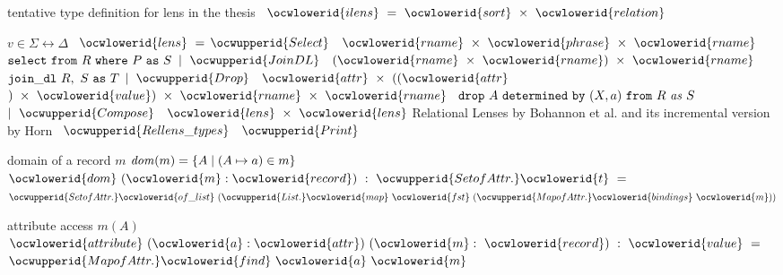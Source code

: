 \documentclass[12pt]{article}
\begin{document}
\ocwendcode{}\ocwindent{0.00em}
tentative type definition for lens in the thesis 
\ocweol
\label{rellens_types.ml:5410}%
\medskip
\ocwbegincode{}\ocwindent{0.00em}
~$\ocwlowerid{ilens}~=~\ocwlowerid{sort}~\times{}~\ocwlowerid{relation}$\medskip

\ocwendcode{}\ocwindent{0.00em}
$v \in \Sigma \leftrightarrow \Delta$ 
\ocweol
\label{rellens_types.ml:5505}%
\medskip
\ocwbegincode{}\ocwindent{0.00em}
~$\ocwlowerid{lens}~=$\ocweol
\ocwindent{2.00em}
$\ocwupperid{Select}~$~$\ocwlowerid{rname}~\times{}~\ocwlowerid{phrase}~\times{}~\ocwlowerid{rname}~$\ocwbc{} $\mt{select\ from}\ R\ \mt{where}\ P\ \mt{as}\ S$ \ocwec{}\ocweol
\ocwindent{1.00em}
$\mid{}~\ocwupperid{JoinDL}~$~$(\ocwlowerid{rname}~\times{}~\ocwlowerid{rname})~\times{}~\ocwlowerid{rname}~$\ocwbc{} $\mathtt{join\_dl}\ R,\ S\ \mathtt{as}\ T$ \ocwec{}\ocweol
\ocwindent{1.00em}
$\mid{}~\ocwupperid{Drop}~$~$\ocwlowerid{attr}~\times{}~((\ocwlowerid{attr}~$$)~\times{}~\ocwlowerid{value})~\times{}~\ocwlowerid{rname}~\times{}~\ocwlowerid{rname}~$\ocweol
\ocwindent{8.00em}
\ocwbc{} $\mt{drop}\ A\ \mt{determined\ by}\ (X,a)\ \mt{from}\ R\ \mi{as}\ S$ \ocwec{}\ocweol
\ocwindent{1.00em}
$\mid{}~\ocwupperid{Compose}~$~$\ocwlowerid{lens}~\times{}~\ocwlowerid{lens}$\ocweol
\ocwendcode{}
\label{rellens.ml:0}%
Relational Lenses by Bohannon et al. and its incremental version by Horn 
\ocweol
\label{rellens.ml:81}%
\medskip
\ocwbegincode{}\ocwindent{0.00em}
~$\ocwupperid{Rellens\_types}$\ocweol
\ocwindent{0.00em}
~$\ocwupperid{Print}$\medskip

\ocwendcode{}\ocwindent{0.00em}
domain of a record $m$ 
\ocweol
\ocwindent{0.00em}
$\mathit{dom}(m)= \{ A \mid   (A \mapsto a) \in m \}$ 
\ocweol
\label{rellens.ml:201}%
\medskip
\ocwbegincode{}\ocwindent{0.00em}
~$\ocwlowerid{dom}~(\ocwlowerid{m}:\ocwlowerid{record})~:~\ocwupperid{SetofAttr.}\ocwlowerid{t}~=~$\ocweol
\ocwindent{1.00em}
$\ocwupperid{SetofAttr.}\ocwlowerid{of\_list}~(\ocwupperid{List.}\ocwlowerid{map}~\ocwlowerid{fst}~(\ocwupperid{MapofAttr.}\ocwlowerid{bindings}~\ocwlowerid{m}))$\medskip

\ocwendcode{}\ocwindent{0.00em}
attribute access $m(A)$ 
\ocweol
\label{rellens.ml:326}%
\medskip
\ocwbegincode{}\ocwindent{0.00em}
~$\ocwlowerid{attribute}~(\ocwlowerid{a}:\ocwlowerid{attr})~(\ocwlowerid{m}:~\ocwlowerid{record})~:~\ocwlowerid{value}~=~$\ocweol
\ocwindent{1.00em}
$\ocwupperid{MapofAttr.}\ocwlowerid{find}~\ocwlowerid{a}~\ocwlowerid{m}$\medskip
\end{document}
